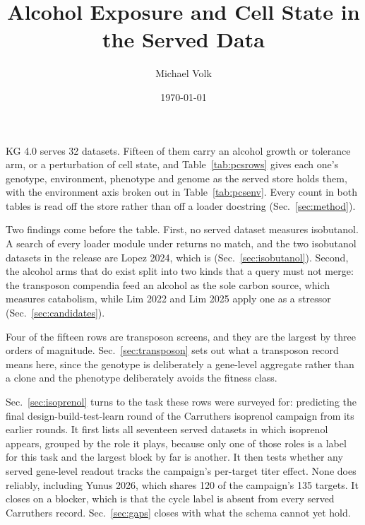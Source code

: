 \documentclass[10pt,a4paper]{article}
\title{\vspace{-1.5em}Alcohol Exposure and Cell State in the Served
\org{Pseudomonas putida} Data}
\author{Michael Volk}
\date{\today}
\begin{document}
\maketitle
\thispagestyle{empty}

\noindent
KG 4.0 serves 32  datasets. Fifteen of them carry an alcohol growth or
tolerance arm, or a perturbation of cell state, and Table~\ref{tab:pcsrows} gives each
one's genotype, environment, phenotype and genome as the served store holds them, with
the environment axis broken out in Table~\ref{tab:pcsenv}. Every count in both tables
is read off the store rather than off a loader docstring (Sec.~\ref{sec:method}).

Two findings come before the table. First, no served  dataset measures
isobutanol. A search of every loader module under 
returns no match, and the two isobutanol datasets in the release are Lopez 2024, which
is 
(Sec.~\ref{sec:isobutanol}). Second, the alcohol arms that do exist split into two
kinds that a query must not merge: the transposon compendia feed an alcohol as the sole
carbon source, which measures catabolism, while Lim 2022 and Lim 2025 apply one as a
stressor (Sec.~\ref{sec:candidates}).

Four of the fifteen rows are transposon screens, and they are the largest by three
orders of magnitude. Sec.~\ref{sec:transposon} sets out what a transposon record means
here, since the genotype is deliberately a gene-level aggregate rather than a clone and
the phenotype deliberately avoids the fitness class.

Sec.~\ref{sec:isoprenol} turns to the task these rows were surveyed for: predicting the
final design-build-test-learn round of the Carruthers isoprenol campaign from its
earlier rounds. It first lists all seventeen served datasets in which isoprenol
appears, grouped by the role it plays, because only one of those roles is a label for
this task and the largest block by far is another. It then tests whether any served
gene-level readout tracks the campaign's per-target titer effect. None does reliably,
including Yunus 2026, which shares 120 of the campaign's 135 targets. It closes on a
blocker, which is that the cycle label is absent from every served Carruthers record. Sec.~\ref{sec:gaps} closes with
what the schema cannot yet hold.

\vspace{0.5em}
\tccontents
\clearpage








\end{document}
